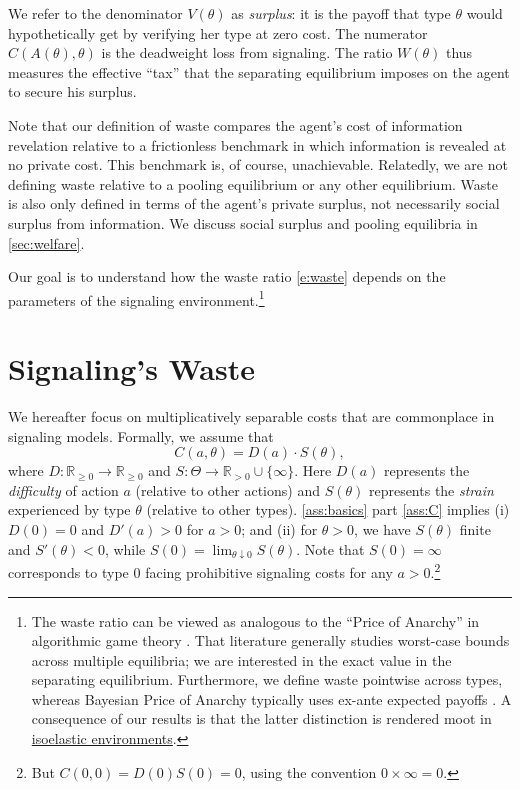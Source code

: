 \documentclass[12 pt]{article}
\theoremstyle{remark}
\theoremstyle{definition}
\newcommand{\R}{\mathbb{R}}
\newcommand{\Rpos}{\R_{\geq0}}
\newcommand{\Rstrpos}{\R_{>0}}
\let\oldfootnote\footnote
\renewcommand\footnote[1]{\oldfootnote{\hspace{.5mm}#1}}
\begin{document}
We refer to the denominator $V(\theta)$ as \emph{surplus}: it is the payoff that type $\theta$ would hypothetically get by verifying her type at zero cost. The numerator $C(A(\theta), \theta)$ is the deadweight loss from signaling. The ratio $W(\theta)$ thus measures the effective ``tax'' that the separating equilibrium imposes on the agent to secure his surplus.

Note that our definition of waste compares the agent's cost of information revelation relative to a frictionless benchmark in which information is revealed at no private cost. This benchmark is, of course, unachievable. Relatedly, we are not defining waste relative to a pooling equilibrium or any other equilibrium. Waste is also only defined in terms of the agent's private surplus, not necessarily social surplus from  information. %
We discuss social surplus and pooling equilibria in \autoref{sec:welfare}.


Our goal is to understand how the waste ratio \eqref{e:waste} depends on the parameters of the signaling environment.\footnote{The waste ratio can be viewed as analogous to the ``Price of Anarchy'' in algorithmic game theory \citep{KP99, Roughgarden05}. That literature generally studies worst-case bounds across multiple equilibria; we are interested in the exact value in the separating equilibrium. Furthermore, we define waste pointwise across types, whereas Bayesian Price of Anarchy typically uses ex-ante expected payoffs \citep{RST17}. A consequence of our results is that the latter distinction is rendered moot in \hyperref[def:isoelastic]{isoelastic environments}.}



\section{Signaling's Waste}
\label{sec:results}

We hereafter focus on multiplicatively separable costs that are commonplace in signaling models. Formally, we assume that
\begin{equation}\label{e:multsep}
C(a, \theta) = D(a) \cdot S(\theta),
\end{equation}
where $D: \Rpos \to \Rpos$ and $S:\Theta \to \Rstrpos \cup \{\infty\}$. Here $D(a)$ represents the \emph{difficulty} of action $a$ (relative to other actions) and $S(\theta)$ represents the \emph{strain} experienced by type $\theta$ (relative to other types). \autoref{ass:basics} part \ref{ass:C} implies (i) $D(0) = 0$ and $D'(a) > 0$ for $a > 0$; and (ii) for $\theta>0$, we have $S(\theta)$ finite and $S'(\theta)<0$, while $S(0)=\lim_{\theta\downarrow 0}S(\theta)$. Note that $S(0) = \infty$ corresponds to type $0$ facing prohibitive signaling costs for any $a>0$.\footnote{But $C(0,0)=D(0)S(0)=0$, using the convention $0\times \infty =0$.} 
\end{document}
